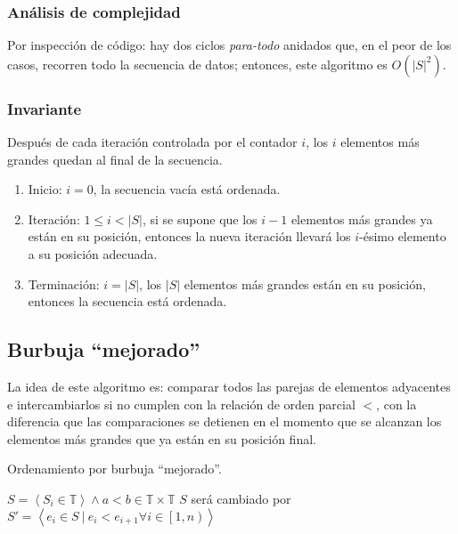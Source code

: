 \documentclass[]{article}
\begin{document}
\subsubsection{Análisis de complejidad} \label{algoritmos:inocente:complejidad}

Por inspección de código: hay dos ciclos {\it para-todo} anidados que, en el peor de los casos, recorren todo la secuencia de datos; entonces, este algoritmo es $O(|S|^2)$.

\subsubsection{Invariante} \label{algoritmos:inocente:invariante}

Después de cada iteración controlada por el contador $i$, los $i$ elementos más grandes quedan al final de la secuencia.

\begin{enumerate}
    \item Inicio: $i=0$, la secuencia vacía está ordenada.
    \item Iteración: $1 \le i<|S|$, si se supone que los $i-1$ elementos más grandes ya están en su posición, entonces la nueva iteración llevará los $i$-ésimo elemento a su posición adecuada.
    \item Terminación: $i=|S|$, los $|S|$ elementos más grandes están en su posición, entonces la secuencia está ordenada.
\end{enumerate}

\subsection{Burbuja ``mejorado''} \label{algoritmos:mejorado}

La idea de este algoritmo es: comparar todos las parejas de elementos adyacentes e intercambiarlos si no cumplen con la relación de orden parcial $<$, con la diferencia que las comparaciones se detienen en el momento que se alcanzan los elementos más grandes que ya están en su posición final.

\begin{algorithm}[!htb]
    \caption{Ordenamiento por burbuja ``mejorado''.}
    \begin{algorithmic}[1]
        \Require $S=\left< S_i \in \mathbb{T} \right> \land a<b \in \mathbb{T} \times \mathbb{T}$
        \Ensure $S$ será cambiado por $S' = \left< e_i \in S  ~ | ~ e_i < e_{i+1} \forall i \in \left[1,n\right)\right>$
         
        \State {}
        \EndIf
        \EndFor
        \EndFor
        \EndProcedure
    \end{algorithmic}
\end{algorithm}
\end{document}
